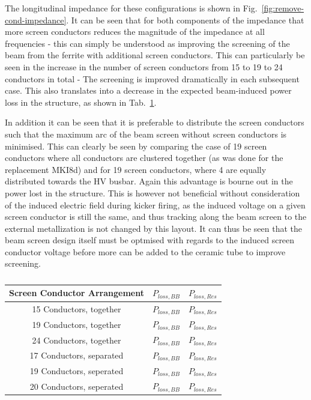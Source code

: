 The longitudinal impedance for these configurations is shown in Fig.~\ref{fig:remove-cond-impedance}. It can be seen that for both components of the impedance that more screen conductors reduces the magnitude of the impedance at all frequencies - this can simply be understood as improving the screening of the beam from the ferrite with additional screen conductors. This can particularly be seen in the increase in the number of screen conductors from 15 to 19 to 24 conductors in total - The screening is improved dramatically in each subsequent case. This also translates into a decrease in the expected beam-induced power loss in the structure, as shown in Tab.~\ref{tab:power-loss-cond-removal}. 

In addition it can be seen that it is preferable to distribute the screen conductors such that the maximum arc of the beam screen without screen conductors is minimised. This can clearly be seen by comparing the case of 19 screen conductors where all conductors are clustered together (as was done for the replacement MKI8d) and for 19 screen conductors, where 4 are equally distributed towards the HV busbar. Again this advantage is bourne out in the power lost in the structure. This is however not beneficial without consideration of the induced electric field during kicker firing, as the induced voltage on a given screen conductor is still the same, and thus tracking along the beam screen to the external metallization is not changed by this layout. It can thus be seen that the beam screen design itself must be optmised with regards to the induced screen conductor voltage before more can be added to the ceramic tube to improve screening.

\begin{table}
\label{tab:power-loss-cond-removal}
\caption{}
\begin{center}
\begin{tabular}{c | c | c}
Screen Conductor Arrangement & $P_{loss, BB}$ & $P_{loss, Res}$ \\ \hline
15 Conductors, together & $P_{loss, BB}$ & $P_{loss, Res}$ \\ \hline
19 Conductors, together & $P_{loss, BB}$ & $P_{loss, Res}$ \\ \hline
24 Conductors, together & $P_{loss, BB}$ & $P_{loss, Res}$ \\ \hline
17 Conductors, separated & $P_{loss, BB}$ & $P_{loss, Res}$ \\ \hline
19 Conductors, seperated & $P_{loss, BB}$ & $P_{loss, Res}$ \\ \hline
20 Conductors, seperated & $P_{loss, BB}$ & $P_{loss, Res}$ \\ 
\end{tabular}
\end{center}
\end{table}

